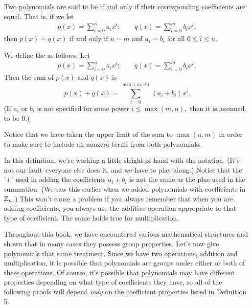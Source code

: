 \begin{defn} Two polynomials are said to be   if and only if their corresponding coefficients are equal. That is, if we let    
\begin{align*}
p(x)  = \sum^{n}_{i=0} a_i x^i; \qquad
q(x)  = \sum^{m}_{i=0} b_i x^i,
\end{align*}
then $p(x) = q(x)$ if and only if $n=m$ and $a_i = b_i$ for all $0 \leq i \leq n$.
\end {defn}

\begin {defn}
We define the  as follows.  Let
\begin{align*}
p(x)  = \sum^{n}_{i=0} a_i x^i ; \qquad
q(x)  = \sum^{m}_{i=0} b_i x^i,
\end{align*}
Then the sum of $p(x)$ and $q(x)$ is
\[
p(x) + q(x) =  \sum_{i=0}^{\max(m,n)} (a_i + b_i) x^i.
\]
(If $a_i$ or $b_i$ is not specified for some power $i \leq \max(m,n),$ then it is assumed to be 0.)
  
\end{defn}
Notice that we have taken the upper limit of the sum to $\max(n,m)$ in order to make sure to include all nonzero terms from both polynomials. 

\begin{rem}
In this definition, we're working a little sleight-of-hand with the notation. (It's not our fault--everyone else does it, and we have to play along.)  Notice that the '+' used in adding the coefficients $a_i + b_i$ is not the same as the plus used in the summation. (We saw this earlier when we added polynomials with coefficients in $\mathbb{Z}_n$.) This won't cause a problem if you always remember that when you are adding coefficients, you always use the additive operation appropriate to that type of coefficient.  The same holds true for multiplication.
\end{rem}


Throughout this book, we have encountered various mathematical structures and shown that in many cases they possess group properties. Let's now give polynomials that same treatment. Since we have two operations, addition and multiplication, it is possible that polynomials are groups under either or both of these operations. Of course, it's possible that polynomials may have different properties depending on what type of coefficients they have, so all of the following proofs will depend \emph{only} on the coefficient properties listed in Definition 5.  

